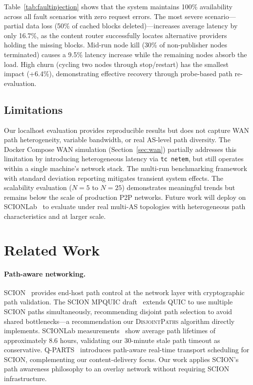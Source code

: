 \documentclass[sigconf,nonacm]{acmart}
\begin{document}
Table~\ref{tab:faultinjection} shows that the system maintains 100\% availability across all fault scenarios with zero request errors. The most severe scenario---partial data loss (50\% of cached blocks deleted)---increases average latency by only 16.7\%, as the content router successfully locates alternative providers holding the missing blocks. Mid-run node kill (30\% of non-publisher nodes terminated) causes a 9.5\% latency increase while the remaining nodes absorb the load. High churn (cycling two nodes through stop/restart) has the smallest impact (+6.4\%), demonstrating effective recovery through probe-based path re-evaluation.

\subsection{Limitations}

Our localhost evaluation provides reproducible results but does not capture WAN path heterogeneity, variable bandwidth, or real AS-level path diversity. The Docker Compose WAN simulation (Section~\ref{sec:wan}) partially addresses this limitation by introducing heterogeneous latency via \texttt{tc netem}, but still operates within a single machine's network stack. The multi-run benchmarking framework with standard deviation reporting mitigates transient system effects. The scalability evaluation ($N{=}5$ to $N{=}25$) demonstrates meaningful trends but remains below the scale of production P2P networks. Future work will deploy on SCIONLab~\cite{kwon2020scionlab} to evaluate under real multi-AS topologies with heterogeneous path characteristics and at larger scale.

\section{Related Work}
\label{sec:related}

\paragraph{Path-aware networking.} SCION~\cite{perrig2017scion} provides end-host path control at the network layer with cryptographic path validation. The SCION MPQUIC draft~\cite{scionmpquic,zaeschke2024scionquic} extends QUIC to use multiple SCION paths simultaneously, recommending disjoint path selection to avoid shared bottlenecks---a recommendation our \textsc{DisjointPaths} algorithm directly implements. SCIONLab measurements~\cite{kwon2020scionlab,scionlabpaths2025} show average path lifetimes of approximately 8.6 hours, validating our 30-minute stale path timeout as conservative. Q-PARTS~\cite{qparts2024} introduces path-aware real-time transport scheduling for SCION, complementing our content-delivery focus. Our work applies SCION's path awareness philosophy to an overlay network without requiring SCION infrastructure.
\end{document}
